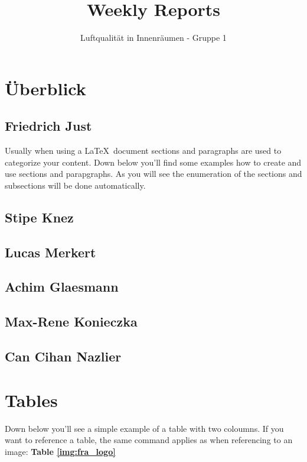 \documentclass[]{article}
\title{Weekly Reports}
\author{Luftqualität in Innenräumen - Gruppe 1}
\begin{document}
\maketitle

\section{Überblick}


\subsection{Friedrich Just}
Usually when using a \LaTeX\ document sections and paragraphs are used to categorize your content. Down below you'll find some examples how to create and use sections and parapgraphs. As you will see the enumeration of the sections and subsections will be done automatically. 

\subsection{Stipe Knez}

\subsection{Lucas Merkert}

\subsection{Achim Glaesmann}

\subsection{Max-Rene Konieczka}

\subsection{Can Cihan Nazlier}


\section{Tables}
Down below you'll see a simple example of a table with two coloumns. If you want to reference a table, the same command applies as when referencing to an image: \textbf{Table \ref{img:fra_logo}}  
	
\end{document}
